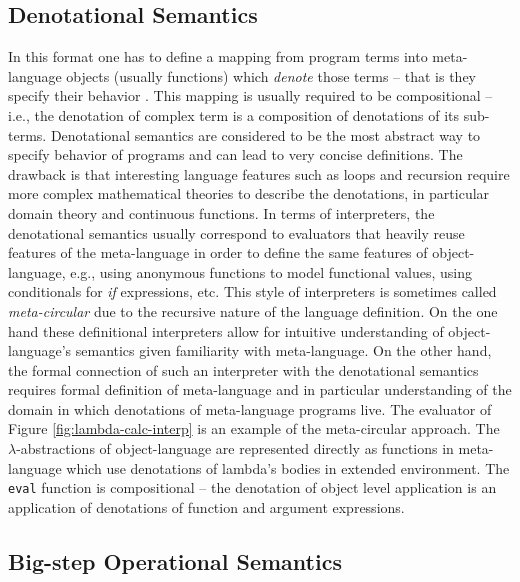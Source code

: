 \subsection*{Denotational Semantics}
In this format one has to define a mapping from program terms into meta-language objects (usually functions) which \emph{denote} those terms -- that is they specify their behavior \cite{scott-denotational-semantics}.
This mapping is usually required to be compositional -- i.e., the denotation of complex term is a composition of denotations of its sub-terms.
Denotational semantics are considered to be the most abstract way to specify behavior of programs and can lead to very concise definitions.
The drawback is that interesting language features such as loops and recursion require more complex mathematical theories to describe the denotations, in particular domain theory and continuous functions.
In terms of interpreters, the denotational semantics usually correspond to evaluators that heavily reuse features of the meta-language in order to define the same features of object-language, e.g., using anonymous functions to model functional values, using conditionals for \textit{if} expressions, etc.
This style of interpreters is sometimes called \textit{meta-circular} due to the recursive nature of the language definition.
On the one hand these definitional interpreters allow for intuitive understanding of object-language's semantics given familiarity with meta-language.
On the other hand, the formal connection of such an interpreter with the denotational semantics requires formal definition of meta-language and in particular understanding of the domain in which denotations of meta-language programs live.
The evaluator of Figure \ref{fig:lambda-calc-interp} is an example of the meta-circular approach.
The $\lambda$-abstractions of object-language are represented directly as functions in meta-language which use denotations of lambda's bodies in extended environment.
The \lstinline!eval! function is compositional -- the denotation of object level application is an application of denotations of function and argument expressions.

\subsection*{Big-step Operational Semantics}

